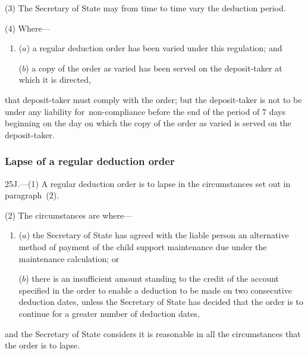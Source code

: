 \documentclass[12pt,a4paper]{article}
\begin{document}
(3) The 
Secretary of State  %
may from time to time vary the deduction period.

(4) Where—
\begin{enumerate}\item[]
($a$) a regular deduction order has been varied under this regulation; and

($b$) a copy of the order as varied has been served on the deposit-taker at which it is directed,
\end{enumerate}
that deposit-taker must comply with the order; but the deposit-taker is not to be under any liability for~non-compliance before the end of the period of 7 days beginning on the day on which the copy of the order as varied is served on the deposit-taker.


\subsubsection[25J. Lapse of a regular deduction order]{Lapse of a regular deduction order}

25J.---(1)  A regular deduction order is to lapse in the circumstances set out in  paragraph~(2).

(2) The circumstances are where—
\begin{enumerate}\item[]
($a$) the 
Secretary of State  %
has agreed with the liable person an alternative method of payment of the child support maintenance due under the maintenance calculation; or

($b$) there is an insufficient amount standing to the credit of the account specified in the order to enable a deduction to be made on two consecutive deduction dates, unless the 
Secretary of State  %
has decided that the order is to continue for a greater number of deduction dates,
\end{enumerate}
and the 
Secretary of State  %
considers it is reasonable in all the circumstances that the order is to lapse.
\end{document}
